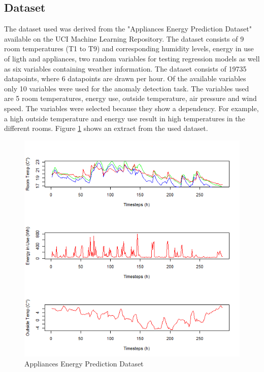 \subsection{Dataset}
The dataset used was derived from the "Appliances Energy Prediction Dataset" available on the UCI Machine Learning Repository. The dataset consists of 9 room temperatures (T1 to T9) and corresponding humidity levels, energy in use of ligth and appliances, two random variables for testing regression models as well as six variables containing weather information. The dataset consists of 19735 datapoints, where 6 datapoints are drawn per hour. Of the available variables only 10 variables were used for the anomaly detection task. The variables used are 5 room temperatures, energy use, outside temperature, air pressure and wind speed. The variables were selected because they show a dependency. For example, a high outside temperature and energy use result in high temperatures in the different rooms. Figure \ref{fig:temp_dataset} shows an extract from the used dataset.


\begin{figure}[h]
	\centering
	\includegraphics[scale=0.6]{Figures/temp_dataset}
	\decoRule
	\caption[Temperature Dataset]{Appliances Energy Prediction Dataset \parencite{Own or UCI???}}
	\label{fig:temp_dataset}
\end{figure}

